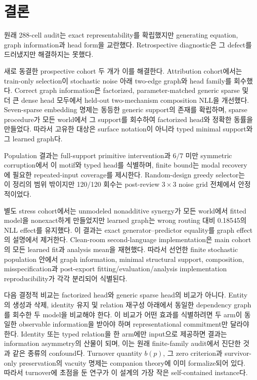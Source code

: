 \section{결론}

원래 288-cell audit는 exact representability를 확립했지만 generating equation,
graph information과 head form을 교란했다. Retrospective diagnostic은 그 defect를
드러냈지만 해결하지는 못했다.

새로 동결한 prospective cohort 두 개가 이를 해결한다. Attribution cohort에서는
train-only selection이 stochastic noise 아래 two-edge graph와 head family를
회수했다. Correct graph information은 factorized, parameter-matched generic
sparse 및 더 큰 dense head 모두에서 held-out two-mechanism composition NLL을
개선했다. Seven-sparse embedding 명제는 동등한 generic support의 존재를 확립하며,
sparse procedure가 모든 world에서 그 support를 회수하여 factorized head와 정확한
동률을 만들었다. 따라서 고유한 대상은 surface notation이 아니라 typed minimal
support와 그 learned graph다.

Population 결과는 full-support primitive intervention과 \(6/7\) 미만 symmetric
corruption에서 이 motif와 typed head를 식별하며, finite bound는 modal recovery에
필요한 repeated-input coverage를 제시한다. Random-design greedy selector는 이
정리의 범위 밖이지만 120/120 회수는 post-review \(3\times3\) noise grid 전체에서
안정적이었다.

별도 stress cohort에서는 unmodeled nonadditive synergy가 모든 world에서 fitted
model을 nonexact하게 만들었지만 learned graph는 wrong routing 대비 0.18545의 NLL
effect를 유지했다. 이 결과는 exact generator--predictor equality를 graph effect의
설명에서 제거한다. Clean-room second-language implementation은 main cohort의 모든
learned fit과 analysis mean을 재현했다. 따라서 선언한 finite stochastic population
안에서 graph information, minimal structural support, composition,
misspecification과 post-export fitting/evaluation/analysis implementation
reproducibility가 각각 분리되어 식별된다.

다음 결정적 비교는 factorized head와 generic sparse head의 비교가 아니다. Entity의
생성과 삭제, identity 유지 및 relation 재구성 아래에서 동일한 dependency graph를
회수한 두 model을 비교해야 한다. 이 비교가 어떤 효과를 식별하려면 두 arm이 동일한
observable information을 받아야 하며 representational commitment만 달라야 한다.
Identity 또는 typed relation을 한 arm에만 input으로 제공하면 결과는 information
asymmetry의 산물이 되며, 이는 원래 finite-family audit에서 진단한 것과 같은 종류의
confound다. Turnover quantity \(b(p)\), 그 zero criterion과 survivor-only preservation의
vacuity 명제는 companion theory에 이미 formalize되어 있다. 따라서 turnover에 초점을
둔 연구가 이 설계의 가장 작은 self-contained instance다.
